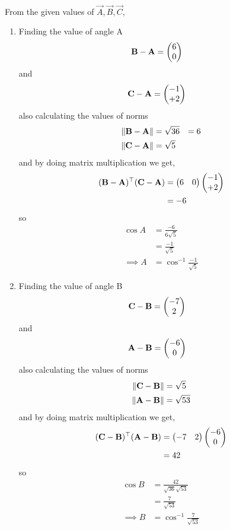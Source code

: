 \solution 
\\
From the given values of $\vec{A},\vec{B},\vec{C}$,\\
\begin{enumerate}

\item Finding the value of angle A
\begin{align}
	\mathbf{B}-\mathbf{A} &=\begin{pmatrix}6\\0\end{pmatrix}
\end{align}
and 
\begin{align}
	\mathbf{C}-\mathbf{A}&= \begin{pmatrix}-1\\+2\end{pmatrix}
\end{align}
also calculating the values of norms
\begin{align}
	\left\lVert\mathbf{B}-\mathbf{A}\right\rVert &= \sqrt{36} &= 6\\
	\left\lVert\mathbf{C}-\mathbf{A}\right\rVert &= \sqrt{5}
\end{align}
and by doing matrix multiplication we get,
\begin{align}
\begin{split}
	(\mathbf{B}-\mathbf{A})^{\top}(\mathbf{C}-\mathbf{A})&=\begin{pmatrix}6&0\end{pmatrix}\begin{pmatrix}-1\\+2\end{pmatrix}\\
	&=-6
\end{split}
\end{align}
so 
\begin{align}
	\cos{A}&= \frac{-6}{6 \sqrt{5}}\\
	&= \frac{-1}{\sqrt{5}}\\
	\implies A&=\cos^{-1}{\frac{-1}{\sqrt{5}}}
\end{align}




\item Finding the value of angle B
\begin{align}
	\mathbf{C}-\mathbf{B} &=\begin{pmatrix}-7\\2\end{pmatrix}
\end{align}
and 
\begin{align}
	\mathbf{A}-\mathbf{B}&= \begin{pmatrix}-6\\0\end{pmatrix}
\end{align}
also calculating the values of norms
\begin{align}
	\left\lVert\mathbf{C}-\mathbf{B}\right\rVert &= \sqrt{5}\\
	\left\lVert\mathbf{A}-\mathbf{B}\right\rVert &= \sqrt{53}
\end{align}
and by doing matrix multiplication we get,
\begin{align}
\begin{split}
	(\mathbf{C}-\mathbf{B})^{\top}(\mathbf{A}-\mathbf{B})&=\begin{pmatrix}-7&2\end{pmatrix}\begin{pmatrix}-6\\0\end{pmatrix}\\
	&= 42
\end{split}
\end{align}
so 
\begin{align}
	\cos{B}&= \frac{42}{\sqrt{36} \sqrt{53}}\\
	&= \frac{7}{\sqrt{53}}\\
	\implies B&=\cos^{-1}{\frac{7}{\sqrt{53}}}
\end{align}




\end{enumerate}
